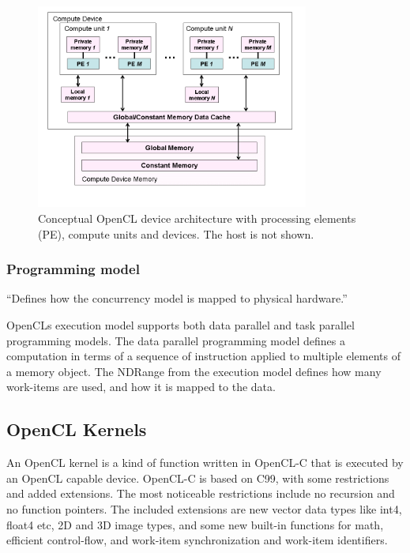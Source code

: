\begin{figure}[h]
  \centering
  \includegraphics[width=0.8\textwidth]{images/memory-model.png}
  \caption{Conceptual OpenCL device architecture with processing
    elements (PE), compute units and devices. The host is not shown.}
  \label{execution-model-figure}
\end{figure}



\subsubsection{Programming model}

``Defines how the concurrency model is mapped to physical hardware.''

OpenCLs execution model supports both data parallel and task parallel
programming models. The data parallel programming model defines a computation
in terms of a sequence of instruction applied to multiple elements of a memory
object. The NDRange from the execution model defines how many work-items are
used, and how it is mapped to the data.


\subsection{OpenCL Kernels}

An OpenCL kernel is a kind of function written in OpenCL-C that is executed by
an OpenCL capable device. OpenCL-C is based on C99, with some restrictions and
added extensions. The most noticeable restrictions include no recursion and no
function pointers. The included extensions are new vector data types like
int4, float4 etc, 2D and 3D image types, and some new built-in functions for
math, efficient control-flow, and work-item synchronization and work-item
identifiers.

